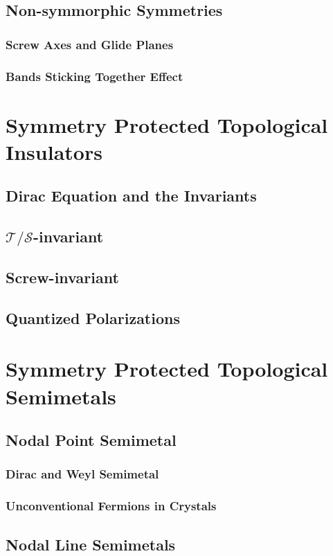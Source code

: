 \subsection{Non-symmorphic Symmetries}
\subsubsection{Screw Axes and Glide Planes}
\subsubsection{Bands Sticking Together Effect}

\section{Symmetry Protected Topological Insulators}
\subsection{Dirac Equation and the Invariants}
\subsection{$\mathcal{T}/\mathcal{S}$-invariant}
\subsection{Screw-invariant}
\subsection{Quantized Polarizations}

\section{Symmetry Protected Topological Semimetals}
\subsection{Nodal Point Semimetal}
\subsubsection{Dirac and Weyl Semimetal}
\subsubsection{Unconventional Fermions in Crystals}

\subsection{Nodal Line Semimetals}
